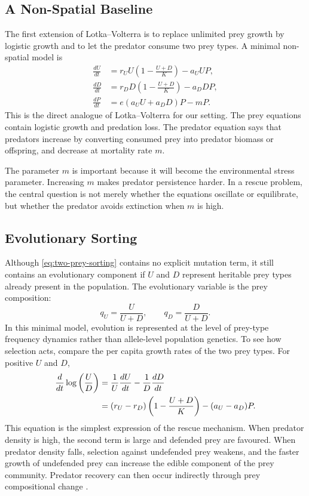\documentclass[12pt,letterpaper]{article}
\numberwithin{equation}{section}
\begin{document}
\subsection{A Non-Spatial Baseline}

The first extension of Lotka--Volterra is to replace unlimited prey growth by logistic
growth and to let the predator consume two prey types. A minimal non-spatial model is
\begin{equation}
\boxed{
\begin{aligned}
    \frac{dU}{dt}
    &= r_U U\left(1-\frac{U+D}{K}\right)-a_U U P,\\
    \frac{dD}{dt}
    &= r_D D\left(1-\frac{U+D}{K}\right)-a_D D P,\\
    \frac{dP}{dt}
    &= e(a_U U+a_D D)P-mP.
\end{aligned}}
\label{eq:two-prey-sorting}
\end{equation}
This is the direct analogue of Lotka--Volterra for our setting. The prey equations
contain logistic growth and predation loss. The predator equation says that predators
increase by converting consumed prey into predator biomass or offspring, and decrease
at mortality rate $m$.

The parameter $m$ is important because it will become the environmental stress
parameter. Increasing $m$ makes predator persistence harder. In a rescue problem, the
central question is not merely whether the equations oscillate or equilibrate, but
whether the predator avoids extinction when $m$ is high.

\subsection{Evolutionary Sorting}

Although \eqref{eq:two-prey-sorting} contains no explicit mutation term, it still
contains an evolutionary component if $U$ and $D$ represent heritable prey types
already present in the population. The evolutionary variable is the prey composition:
\begin{equation}
    q_U=\frac{U}{U+D},
    \qquad
    q_D=\frac{D}{U+D}.
\end{equation}
In this minimal model, evolution is represented at the level of prey-type frequency
dynamics rather than allele-level population genetics.
To see how selection acts, compare the per capita growth rates of the two prey types.
For positive $U$ and $D$,
\begin{align}
    \frac{d}{dt}\log\left(\frac{U}{D}\right)
    &=
    \frac{1}{U}\frac{dU}{dt}
    -
    \frac{1}{D}\frac{dD}{dt} \notag\\
    &=
    (r_U-r_D)\left(1-\frac{U+D}{K}\right)
    -
    (a_U-a_D)P.
\end{align}
This equation is the simplest expression of the rescue mechanism. When predator
density is high, the second term is large and defended prey are favoured. When predator
density falls, selection against undefended prey weakens, and the faster growth of
undefended prey can increase the edible component of the prey community. Predator
recovery can then occur indirectly through prey compositional change
\cite{yamamichi2015}.
\end{document}
